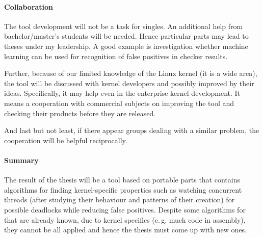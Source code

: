\documentclass[11pt,a4paper]{article}
\begin{document}
\paragraph{Collaboration} The tool development will not be a task for singles.
An additional help from bachelor/master's students will be needed. Hence
particular parts may lead to theses under my leadership. A good example is
investigation whether machine learning can be used for recognition of false
positives in checker results.

Further, because of our limited knowledge of the Linux kernel (it is a wide
area), the tool will be discussed with kernel developers and possibly improved
by their ideas. Specifically, it may help even in the enterprise kernel
development. It means a cooperation with commercial subjects on improving the
tool and checking their products before they are released.

And last but not least, if there appear groups dealing with a similar problem,
the cooperation will be helpful reciprocally.

\paragraph{Summary} The result of the thesis will be a tool based on
portable parts that contains algorithms for finding kernel-specific properties
such as watching concurrent threads (after studying their behaviour and
patterns of their creation) for possible deadlocks while reducing false
positives. Despite some algorithms for that are already known, due to kernel
specifics (e.\,g. much code in assembly), they cannot be all applied and hence
the thesis must come up with new ones.
\end{document}
